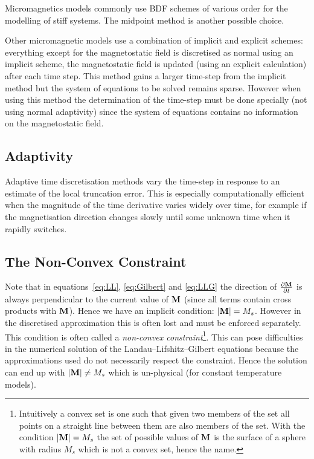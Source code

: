 Micromagnetics models commonly use BDF schemes of various order\cite{Suess2002} for the modelling of stiff systems. The midpoint method is another possible choice.\cite{DAquino2005}

Other micromagnetic models use a combination of implicit and explicit schemes: everything except for the magnetostatic field is discretised as normal using an implicit scheme, the magnetostatic field is updated (using an explicit calculation) after each time step. This method gains a larger time-step from the implicit method but the system of equations to be solved remains sparse. However when using this method the determination of the time-step must be done specially (\ie not using normal adaptivity) since the system of equations contains no information on the magnetostatic field.\cite{Schrefl1997}

\subsection{Adaptivity}
\label{sec:adaptivity}

Adaptive time discretisation methods vary the time-step in response to an estimate of the local truncation error. This is especially computationally efficient when the magnitude of the time derivative varies widely over time, for example if the magnetisation direction changes slowly until some unknown time when it rapidly switches.

\subsection{The Non-Convex Constraint}
\label{sec:ensuring-constant-mv}

Note that in equations~\eqref{eq:LL}, \eqref{eq:Gilbert} and \eqref{eq:LLG} the direction of $\frac{\partial \mathbf{M}}{\partial t}$ is always perpendicular to the current value of $\mathbf{M}$ (since all terms contain cross products with $\mathbf{M}$). Hence we have an implicit condition: $\lvert \mathbf{M} \rvert = M_s$. However in the discretised approximation this is often lost and must be enforced separately. This condition is often called a  \emph{non-convex constraint}\footnote{Intuitively a convex set is one such that given two members of the set all points on a straight line between them are also members of the set. With the condition $\lvert \mathbf{M} \rvert=M_s$ the set of possible values of $\mathbf{M}$ is the surface of a sphere with radius $M_s$ which is not a convex set, hence the name.}. This can pose difficulties in the numerical solution of the Landau--Lifshitz--Gilbert equations because the approximations used do not necessarily respect the constraint. Hence the solution can end up with $|\mathbf{M}| \neq M_s$ which is un-physical (for constant temperature models).

